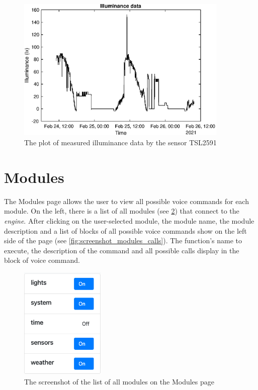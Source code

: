 \begin{figure}[H]
    \centering
    \includegraphics[width=0.9\textwidth]{img/illuminance_data.eps}
    \caption{The plot of measured illuminance data by the sensor TSL2591}
    \label{fig:illuminance_data}
\end{figure}

\section{Modules} \label{section:modules}

The Modules page allows the user to view all possible voice commands for each module. On the left, there is a list of all modules (see \cref{fig:screenshot_modules_modules}) that connect to the \textit{engine}. After clicking on the user-selected module, the module name, the module description and a list of blocks of all possible voice commands show on the left side of the page (see \cref{fig:screenshot_modules_calls}). The function's name to execute, the description of the command and all possible calls display in the block of voice command.

\begin{figure}[H]
    \centering
    \includegraphics[width=0.36\textwidth]{img/screenshot_modules_modules.png}
    \caption{The screenshot of the list of all modules on the Modules page}
    \label{fig:screenshot_modules_modules}
\end{figure}


